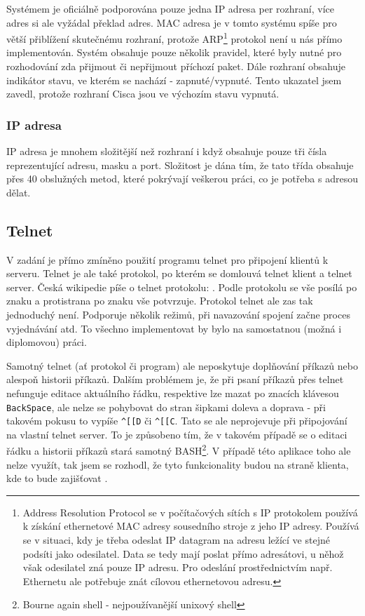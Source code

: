 Systémem je oficiálně podporována pouze jedna IP adresa per rozhraní, více adres si ale vyžádal překlad adres. MAC adresa je v tomto systému spíše pro větší přiblížení skutečnému rozhraní, protože ARP\footnote{Address Resolution Protocol se v počítačových sítích s IP protokolem používá k získání ethernetové MAC adresy sousedního stroje z jeho IP adresy. Používá se v situaci, kdy je třeba odeslat IP datagram na adresu ležící ve stejné podsíti jako odesilatel. Data se tedy mají poslat přímo adresátovi, u něhož však odesilatel zná pouze IP adresu. Pro odeslání prostřednictvím např. Ethernetu ale potřebuje znát cílovou ethernetovou adresu.\cite{wiki:arp}} protokol není u nás přímo implementován. Systém obsahuje pouze několik pravidel, které byly nutné pro rozhodování zda přijmout či nepřijmout příchozí paket. Dále rozhraní obsahuje indikátor stavu, ve kterém se nachází - zapnuté/vypnuté. Tento ukazatel jsem zavedl, protože rozhraní Cisca jsou ve výchozím stavu vypnutá.

\subsubsection{IP adresa}
IP adresa je mnohem složitější než rozhraní i když obsahuje pouze tři čísla reprezentující adresu, masku a port. Složitost je dána tím, že tato třída obsahuje přes 40 obslužných metod, které pokrývají veškerou práci, co je potřeba s adresou dělat.


\subsection{Telnet}
V zadání je přímo zmíněno použití programu telnet pro připojení klientů k serveru. Telnet je ale také protokol, po kterém se domlouvá telnet klient a telnet server. Česká wikipedie píše o telnet protokolu: . Podle protokolu se vše posílá po znaku a protistrana po znaku vše potvrzuje. Protokol telnet ale zas tak jednoduchý není. Podporuje několik režimů, při navazování spojení začne proces vyjednávání atd. To všechno implementovat by bylo na samostatnou (možná i diplomovou) práci. 

Samotný telnet (ať protokol či program) ale neposkytuje doplňování příkazů nebo alespoň historii příkazů. Dalším problémem je, že při psaní příkazů přes telnet nefunguje editace aktuálního řádku, respektive lze mazat po znacích klávesou \verb|BackSpace|, ale nelze se pohybovat do stran šipkami doleva a doprava - při takovém pokusu to vypíše \verb|^[[D| či \verb|^[[C|. Tato  se ale neprojevuje při připojování na vlastní telnet server. To je způsobeno tím, že v takovém případě se o editaci řádku a historii příkazů stará samotný BASH\footnote{Bourne again shell - nejpoužívanější unixový shell}. V případě této aplikace toho ale nelze využít, tak jsem se rozhodl, že tyto funkcionality budou na straně klienta, kde to bude zajišťovat . 

